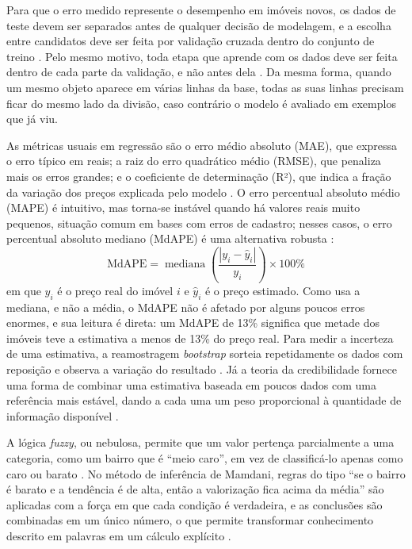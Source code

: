 \documentclass[
  article,
  a4paper,
  12pt,
  fleqn,
  oneside,
  chapter = TITLE,
  section = TITLE,
]{abntex2}
\begin{document}
Para que o erro medido represente o desempenho em imóveis novos, os dados de teste devem ser separados antes de qualquer decisão de modelagem, e a escolha entre candidatos deve ser feita por validação cruzada dentro do conjunto de treino \cite{kohavi1995}. Pelo mesmo motivo, toda etapa que aprende com os dados deve ser feita dentro de cada parte da validação, e não antes dela \cite{hastie2009}. Da mesma forma, quando um mesmo objeto aparece em várias linhas da base, todas as suas linhas precisam ficar do mesmo lado da divisão, caso contrário o modelo é avaliado em exemplos que já viu.

As métricas usuais em regressão são o erro médio absoluto (MAE), que expressa o erro típico em reais; a raiz do erro quadrático médio (RMSE), que penaliza mais os erros grandes; e o coeficiente de determinação (R²), que indica a fração da variação dos preços explicada pelo modelo \cite{james2021}. O erro percentual absoluto médio (MAPE) é intuitivo, mas torna-se instável quando há valores reais muito pequenos, situação comum em bases com erros de cadastro; nesses casos, o erro percentual absoluto mediano (MdAPE) é uma alternativa robusta \cite{hyndman2006}:
\begin{equation}
\text{MdAPE} = \operatorname{mediana}\left(\frac{|y_i - \hat{y}_i|}{y_i}\right) \times 100\%
\label{eq:mdape}
\end{equation}
em que $y_i$ é o preço real do imóvel $i$ e $\hat{y}_i$ é o preço estimado. Como usa a mediana, e não a média, o MdAPE não é afetado por alguns poucos erros enormes, e sua leitura é direta: um MdAPE de 13\% significa que metade dos imóveis teve a estimativa a menos de 13\% do preço real. Para medir a incerteza de uma estimativa, a reamostragem \textit{bootstrap} sorteia repetidamente os dados com reposição e observa a variação do resultado \cite{efron1993}. Já a teoria da credibilidade fornece uma forma de combinar uma estimativa baseada em poucos dados com uma referência mais estável, dando a cada uma um peso proporcional à quantidade de informação disponível \cite{buhlmann2005}.

A lógica \textit{fuzzy}, ou nebulosa, permite que um valor pertença parcialmente a uma categoria, como um bairro que é ``meio caro'', em vez de classificá-lo apenas como caro ou barato \cite{zadeh1965}. No método de inferência de Mamdani, regras do tipo ``se o bairro é barato e a tendência é de alta, então a valorização fica acima da média'' são aplicadas com a força em que cada condição é verdadeira, e as conclusões são combinadas em um único número, o que permite transformar conhecimento descrito em palavras em um cálculo explícito \cite{mamdani1975}.
\end{document}
